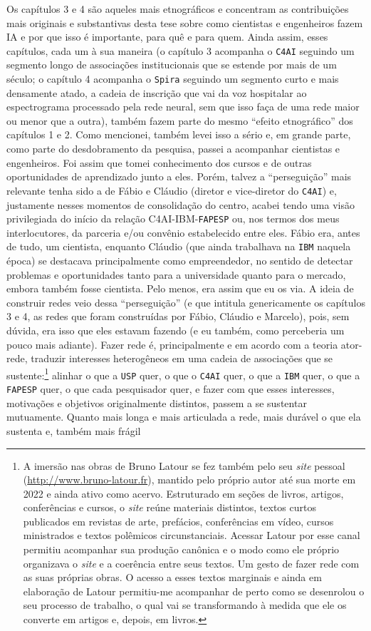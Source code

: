Os capítulos 3 e 4 são aqueles mais etnográficos e concentram as contribuições mais originais e substantivas desta tese sobre como cientistas e engenheiros fazem IA e por que isso é importante, para quê e para quem. Ainda assim, esses capítulos, cada um à sua maneira (o capítulo 3 acompanha o \texttt{C4AI} seguindo um segmento longo de associações institucionais que se estende por mais de um século; o capítulo 4 acompanha o \texttt{Spira} seguindo um segmento curto e mais densamente atado, a cadeia de inscrição que vai da voz hospitalar ao espectrograma processado pela rede neural, sem que isso faça de uma rede maior ou menor que a outra), também fazem parte do mesmo \enquote{efeito etnográfico} dos capítulos 1 e 2. Como mencionei, também levei isso a sério e, em grande parte, como parte do desdobramento da pesquisa, passei a acompanhar cientistas e engenheiros. Foi assim que tomei conhecimento dos cursos e de outras oportunidades de aprendizado junto a eles. Porém, talvez a \enquote{perseguição} mais relevante tenha sido a de Fábio e Cláudio (diretor e vice-diretor do \texttt{C4AI}) e, justamente nesses momentos de consolidação do centro, acabei tendo uma visão privilegiada do início da relação C4AI-IBM-\texttt{FAPESP} ou, nos termos dos meus interlocutores, da parceria e/ou convênio estabelecido entre eles. Fábio era, antes de tudo, um cientista, enquanto Cláudio (que ainda trabalhava na \texttt{IBM} naquela época) se destacava principalmente como empreendedor, no sentido de detectar problemas e oportunidades tanto para a universidade quanto para o mercado, embora também fosse cientista. Pelo menos, era assim que eu os via. A ideia de construir redes veio dessa \enquote{perseguição} (e que intitula genericamente os capítulos 3 e 4, as redes que foram construídas por Fábio, Cláudio e Marcelo), pois, sem dúvida, era isso que eles estavam fazendo (e eu também, como perceberia um pouco mais adiante). Fazer rede é, principalmente e em acordo com a teoria  ator-rede, traduzir interesses heterogêneos em uma cadeia de associações que se sustente:\footnote{A imersão nas obras de Bruno Latour se fez também pelo seu \textit{site} pessoal (\url{http://www.bruno-latour.fr}), mantido pelo próprio autor até sua morte em 2022 e ainda ativo como acervo. Estruturado em seções de livros, artigos, conferências e cursos, o \textit{site} reúne materiais distintos, textos curtos publicados em revistas de arte, prefácios, conferências em vídeo, cursos ministrados e textos polêmicos circunstanciais. Acessar Latour por esse canal permitiu acompanhar sua produção canônica e o modo como ele próprio organizava o \textit{site} e a coerência entre seus textos. Um gesto de fazer rede com as suas próprias obras. O acesso a esses textos marginais e ainda em elaboração de Latour permitiu-me acompanhar de perto como se desenrolou o seu processo de trabalho, o qual vai se transformando à medida que ele os converte em artigos e, depois, em livros.} alinhar o que a \texttt{USP} quer, o que o \texttt{C4AI} quer, o que a \texttt{IBM} quer, o que a \texttt{FAPESP} quer, o que cada pesquisador quer, e fazer com que esses interesses, motivações e objetivos originalmente distintos, passem a se sustentar mutuamente. Quanto mais longa e mais articulada a rede, mais durável o que ela sustenta e, também mais frágil 